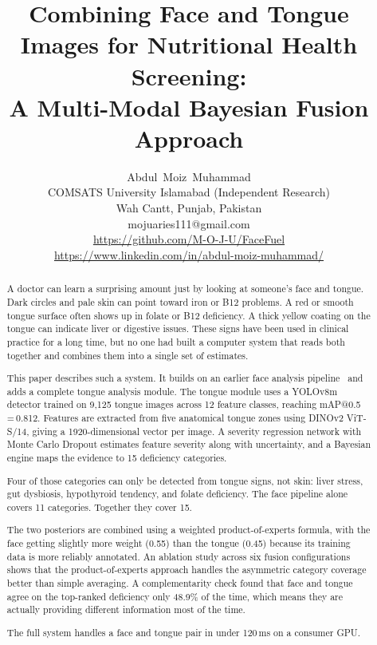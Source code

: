 \documentclass[journal]{IEEEtran}
\begin{document}
\title{Combining Face and Tongue Images for Nutritional Health Screening:\\
A Multi-Modal Bayesian Fusion Approach}

\author{Abdul~Moiz~Muhammad\\
COMSATS University Islamabad (Independent Research)\\
Wah Cantt, Punjab, Pakistan\\
mojuaries111@gmail.com\\
\url{https://github.com/M-O-J-U/FaceFuel} \\
\url{https://www.linkedin.com/in/abdul-moiz-muhammad/}}


\maketitle

\begin{abstract}
A doctor can learn a surprising amount just by looking at someone's face and
tongue. Dark circles and pale skin can point toward iron or B12 problems.
A red or smooth tongue surface often shows up in folate or B12 deficiency.
A thick yellow coating on the tongue can indicate liver or digestive issues.
These signs have been used in clinical practice for a long time, but no one
had built a computer system that reads both together and combines them into
a single set of estimates.

This paper describes such a system. It builds on an earlier face analysis
pipeline~\cite{muhammad2026facefuel} and adds a complete tongue analysis
module. The tongue module uses a YOLOv8m detector trained on 9{,}125 tongue
images across 12 feature classes, reaching mAP@0.5\,=\,0.812. Features are
extracted from five anatomical tongue zones using DINOv2 ViT-S/14, giving a
1920-dimensional vector per image. A severity regression network with Monte
Carlo Dropout estimates feature severity along with uncertainty, and a Bayesian
engine maps the evidence to 15 deficiency categories.

Four of those categories can only be detected from tongue signs, not skin:
liver stress, gut dysbiosis, hypothyroid tendency, and folate deficiency.
The face pipeline alone covers 11 categories. Together they cover 15.

The two posteriors are combined using a weighted product-of-experts formula,
with the face getting slightly more weight (0.55) than the tongue (0.45) because
its training data is more reliably annotated. An ablation study across six
fusion configurations shows that the product-of-experts approach handles the
asymmetric category coverage better than simple averaging. A complementarity
check found that face and tongue agree on the top-ranked deficiency only
48.9\% of the time, which means they are actually
providing different information most of the time.

The full system handles a face and tongue pair in under 120\,ms on a consumer
GPU.
\end{abstract}
\end{document}
